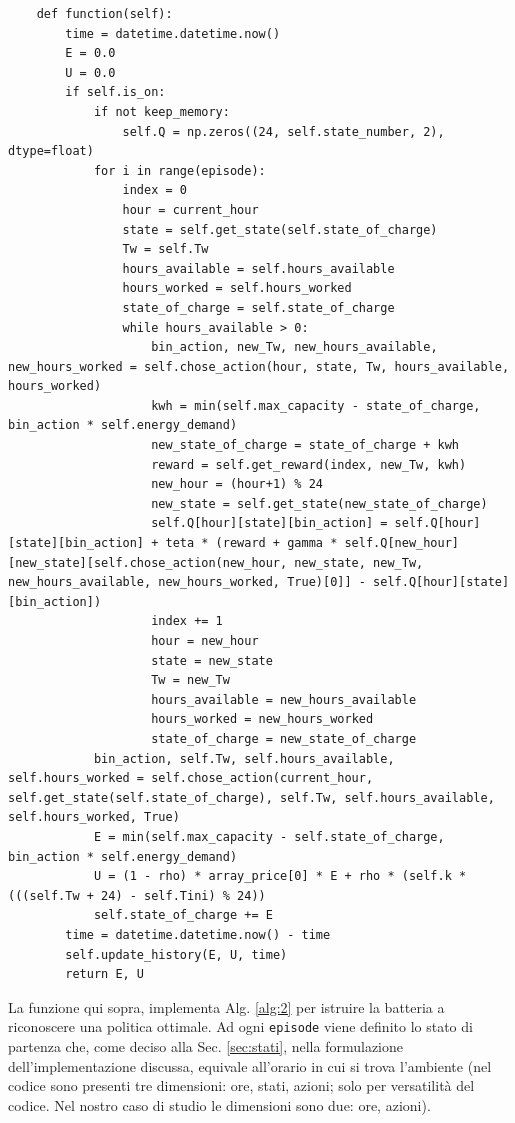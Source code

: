 \documentclass[italian, Lau, oneside]{sapthesis}
\begin{document}
\begin{verbatim}
    def function(self):
        time = datetime.datetime.now()
        E = 0.0
        U = 0.0
        if self.is_on:
            if not keep_memory:
                self.Q = np.zeros((24, self.state_number, 2), dtype=float)
            for i in range(episode):
                index = 0
                hour = current_hour
                state = self.get_state(self.state_of_charge)
                Tw = self.Tw
                hours_available = self.hours_available
                hours_worked = self.hours_worked
                state_of_charge = self.state_of_charge
                while hours_available > 0:
                    bin_action, new_Tw, new_hours_available, new_hours_worked = self.chose_action(hour, state, Tw, hours_available, hours_worked)
                    kwh = min(self.max_capacity - state_of_charge, bin_action * self.energy_demand)
                    new_state_of_charge = state_of_charge + kwh
                    reward = self.get_reward(index, new_Tw, kwh)
                    new_hour = (hour+1) % 24
                    new_state = self.get_state(new_state_of_charge)
                    self.Q[hour][state][bin_action] = self.Q[hour][state][bin_action] + teta * (reward + gamma * self.Q[new_hour][new_state][self.chose_action(new_hour, new_state, new_Tw, new_hours_available, new_hours_worked, True)[0]] - self.Q[hour][state][bin_action])
                    index += 1
                    hour = new_hour
                    state = new_state
                    Tw = new_Tw
                    hours_available = new_hours_available
                    hours_worked = new_hours_worked
                    state_of_charge = new_state_of_charge
            bin_action, self.Tw, self.hours_available, self.hours_worked = self.chose_action(current_hour, self.get_state(self.state_of_charge), self.Tw, self.hours_available, self.hours_worked, True)
            E = min(self.max_capacity - self.state_of_charge, bin_action * self.energy_demand)
            U = (1 - rho) * array_price[0] * E + rho * (self.k * (((self.Tw + 24) - self.Tini) % 24))
            self.state_of_charge += E
        time = datetime.datetime.now() - time
        self.update_history(E, U, time)
        return E, U
\end{verbatim}

La funzione qui sopra, implementa Alg. \ref{alg:2} per istruire la batteria a riconoscere una politica ottimale. Ad ogni \texttt{episode} viene definito lo stato di partenza che, come deciso alla Sec. \ref{sec:stati}, nella formulazione dell'implementazione discussa, equivale all'orario in cui si trova l'ambiente (nel codice sono presenti tre dimensioni: ore, stati, azioni; solo per versatilità del codice. Nel nostro caso di studio le dimensioni sono due: ore, azioni). 
\end{document}
